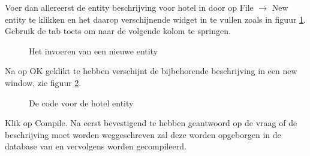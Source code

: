 Voer dan allereerst de entity beschrijving voor hotel in door op File $\rightarrow$ New entity 
te klikken en het daarop verschijnende widget in te vullen zoals in figuur \ref{newent}.
Gebruik de tab toets om naar de volgende kolom te springen.
\begin{figure}[h]
\centerline{}
\caption{Het invoeren van een nieuwe entity}
\label{newent}
\end{figure}

Na op OK geklikt te hebben verschijnt de bijbehorende  beschrijving
in een new window, zie figuur \ref{hotelent}.
\begin{figure}[h]
\centerline{}
\caption{De  code voor de hotel entity}
\label{hotelent}
\end{figure}
Klik op Compile. 
Na eerst bevestigend te hebben geantwoord op de vraag of de beschrijving 
moet worden weggeschreven zal deze worden
opgeborgen in de database van 
en vervolgens worden gecompileerd.
\FloatBarrier

